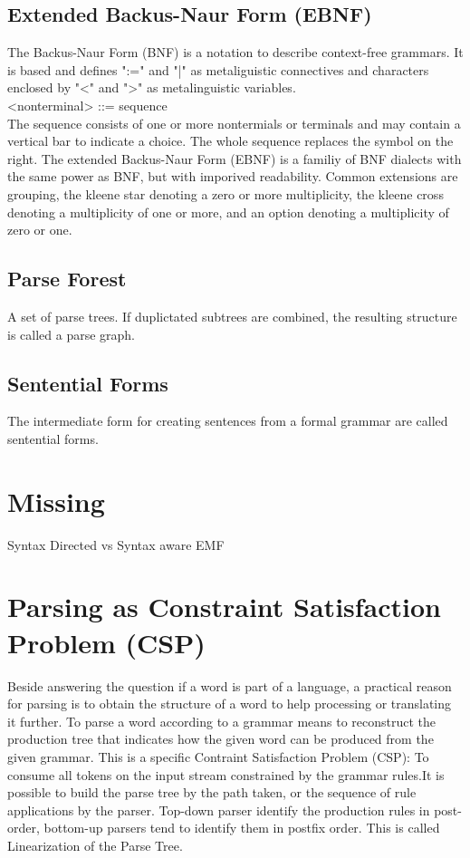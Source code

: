 \subsection{Extended Backus-Naur Form (EBNF)} 
The Backus-Naur Form (BNF) is a notation to describe context-free grammars. It is based \cite{BNF} and defines ":=" and "|" as metaliguistic connectives and characters enclosed by "<" and ">" as metalinguistic variables.\\
 <nonterminal> ::= sequence\\
The sequence consists of one or more nontermials or terminals and may contain a vertical bar to indicate a choice. The whole sequence replaces the symbol on the right. The extended Backus-Naur Form (EBNF) is a familiy of BNF dialects with the same power as BNF, but with imporived readability. Common extensions are grouping, the kleene star denoting a zero or more multiplicity, the kleene cross denoting a multiplicity of one or more, and an option denoting a multiplicity of zero or one. \cite{ParserBook}

\subsection{Parse Forest} 
A set of parse trees. If duplictated subtrees are combined, the resulting structure is called a parse graph.\cite{ParserBook}

\subsection{Sentential Forms}   
The intermediate form for creating sentences from a formal grammar are called sentential forms. \cite{ParserBook}



\section{Missing}
Syntax Directed vs Syntax aware
EMF

\section{Parsing as Constraint Satisfaction Problem (CSP)} 
Beside answering the question if a word is part of a language, a practical reason for parsing is to obtain the structure of a word to help processing or translating it further. To parse a word according to a grammar means to reconstruct the production tree that indicates how the given word can be produced from the given grammar. This is a specific Contraint Satisfaction Problem (CSP): To consume all tokens on the input stream constrained by the grammar rules.It is possible to build the parse tree by the path taken, or the sequence of rule applications by the parser.  Top-down parser identify the production rules in post-order, bottom-up parsers tend to identify them in postfix order. This is called Linearization of the Parse Tree.\cite{ParserBook}
